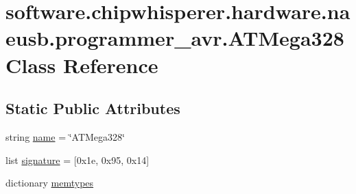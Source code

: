 \hypertarget{classsoftware_1_1chipwhisperer_1_1hardware_1_1naeusb_1_1programmer__avr_1_1ATMega328}{}\section{software.\+chipwhisperer.\+hardware.\+naeusb.\+programmer\+\_\+avr.\+A\+T\+Mega328 Class Reference}
\label{classsoftware_1_1chipwhisperer_1_1hardware_1_1naeusb_1_1programmer__avr_1_1ATMega328}
\subsection*{Static Public Attributes}
\begin{DoxyCompactItemize}
\item 
string \hyperlink{classsoftware_1_1chipwhisperer_1_1hardware_1_1naeusb_1_1programmer__avr_1_1ATMega328_a417809ff45aa4bc6f977aaf6b349ab86}{name} = \char`\"{}A\+T\+Mega328\char`\"{}
\item 
list \hyperlink{classsoftware_1_1chipwhisperer_1_1hardware_1_1naeusb_1_1programmer__avr_1_1ATMega328_a658db9ba7e3a3e6b1a4bc1b3ce66a915}{signature} = \mbox{[}0x1e, 0x95, 0x14\mbox{]}
\item 
dictionary \hyperlink{classsoftware_1_1chipwhisperer_1_1hardware_1_1naeusb_1_1programmer__avr_1_1ATMega328_a0ae71c3cc284c6bf094fe48b20298714}{memtypes}
\end{DoxyCompactItemize}


